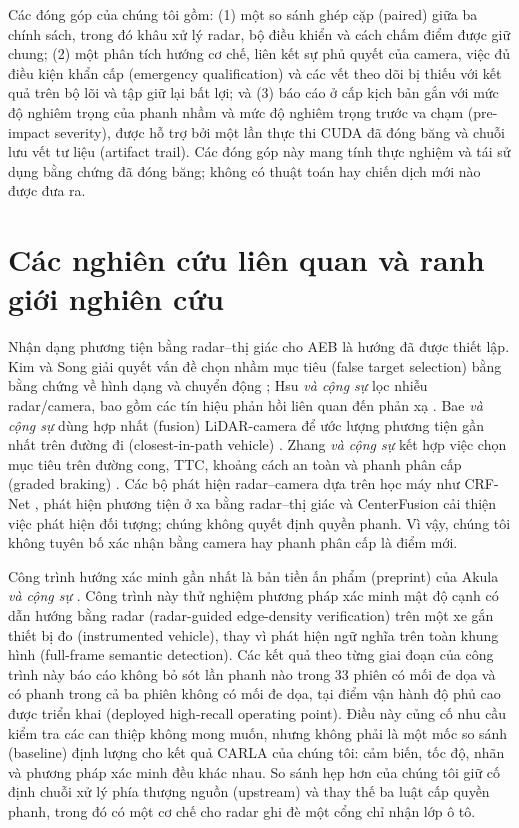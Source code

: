 \documentclass[conference]{IEEEtran}
\begin{document}
Các đóng góp của chúng tôi gồm: (1) một so sánh ghép cặp (paired) giữa ba chính sách,
trong đó khâu xử lý radar, bộ điều khiển và cách chấm điểm được giữ chung; (2)
một phân tích hướng cơ chế, liên kết sự phủ quyết của camera, việc đủ điều kiện
khẩn cấp (emergency qualification) và các vết theo dõi bị thiếu với kết quả
trên bộ lõi và tập giữ lại bất lợi; và (3) báo cáo ở cấp kịch bản gắn với mức
độ nghiêm trọng của phanh nhầm và mức độ nghiêm trọng trước va chạm (pre-impact
severity), được hỗ trợ bởi một lần thực thi CUDA đã đóng băng và chuỗi lưu vết
tư liệu (artifact trail). Các đóng góp này mang tính thực nghiệm và tái sử dụng
bằng chứng đã đóng băng; không có thuật toán hay chiến dịch mới nào được đưa
ra.

\section{Các nghiên cứu liên quan và ranh giới nghiên cứu}
Nhận dạng phương tiện bằng radar--thị giác cho AEB là hướng đã được thiết lập.
Kim và Song giải quyết vấn đề chọn nhầm mục tiêu (false target selection) bằng
bằng chứng về hình dạng và chuyển động \cite{kim2013vehicle}; Hsu \emph{và
cộng sự} lọc nhiễu radar/camera, bao gồm các tín hiệu phản hồi liên quan đến
phản xạ \cite{hsu2015noise}. Bae \emph{và cộng sự} dùng hợp nhất (fusion)
LiDAR-camera để ước lượng phương tiện gần nhất trên đường đi (closest-in-path
vehicle) \cite{bae2021cipv}. Zhang \emph{và cộng sự} kết hợp việc chọn mục
tiêu trên đường cong, TTC, khoảng cách an toàn và phanh phân cấp (graded
braking) \cite{zhang2023curved}. Các bộ phát hiện radar--camera dựa trên học
máy như CRF-Net \cite{nobis2019crfnet}, phát hiện phương tiện ở xa bằng
radar--thị giác \cite{chadwick2019distant} và CenterFusion
\cite{nabati2021centerfusion} cải thiện việc phát hiện đối tượng; chúng không
quyết định quyền phanh. Vì vậy, chúng tôi không tuyên bố xác nhận bằng camera
hay phanh phân cấp là điểm mới.

Công trình hướng xác minh gần nhất là bản tiền ấn phẩm (preprint) của Akula
\emph{và cộng sự} \cite{akula2026radarguided}. Công trình này thử nghiệm
phương pháp xác minh mật độ cạnh có dẫn hướng bằng radar (radar-guided
edge-density verification) trên một xe gắn thiết bị đo (instrumented vehicle),
thay vì phát hiện ngữ nghĩa trên toàn khung hình (full-frame semantic
detection). Các kết quả theo từng giai đoạn của công trình này báo cáo không
bỏ sót lần phanh nào trong 33 phiên có mối đe dọa và có phanh trong cả ba
phiên không có mối đe dọa, tại điểm vận hành độ phủ cao được triển khai
(deployed high-recall operating point). Điều này củng cố nhu cầu kiểm tra các
can thiệp không mong muốn, nhưng không phải là một mốc so sánh (baseline) định
lượng cho kết quả CARLA của chúng tôi: cảm biến, tốc độ, nhãn và phương pháp
xác minh đều khác nhau. So sánh hẹp hơn của chúng tôi giữ cố định chuỗi xử lý
phía thượng nguồn (upstream) và thay thế ba luật cấp quyền phanh, trong đó có
một cơ chế cho radar ghi đè một cổng chỉ nhận lớp ô tô.
\end{document}
